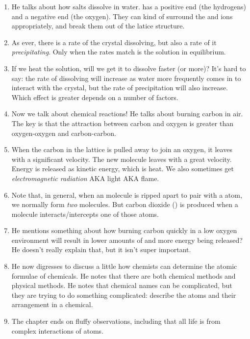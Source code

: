 \begin{enumerate}
  \item He talks about how salts dissolve in water.  has a
  positive end (the hydrogens) and a negative end (the oxygen). They can
  kind of surround the  and  ions appropriately, and
  break them out of the latice structure.

  \item As ever, there is a rate of the crystal dissolving, but also a
  rate of it \emph{precipitating}. Only when the rates match is the
  solution in equilibrium.

  \item If we heat the solution, will we get it to dissolve faster (or
  more)? It's hard to say: the rate of dissolving will increase as water
  more frequently comes in to interact with the crystal, but the rate of
  precipitation will also increase. Which effect is greater depends on a
  number of factors.

  \item Now we talk about chemical reactions! He talks about burning
  carbon in air. The key is that the attraction between carbon and
  oxygen is greater than oxygen-oxygen and carbon-carbon.

  \item When the carbon in the lattice is pulled away to join an oxygen,
  it leaves with a significant velocity. The new  molecule leaves
  with a great velocity. Energy is released as kinetic energy, which is
  heat. We also sometimes get \emph{electromagnetic radiation} AKA
  light AKA flame.

  \item Note that, in general, when an  molecule is ripped apart
  to pair with a  atom, we normally form \emph{two} 
  molecules. But carbon dioxide () is produced when a 
  molecule interacts/intercepts one of those  atoms.

  \item He mentions something about how burning carbon quickly in a low
  oxygen environment will result in lower amounts of  and more
  energy being released? He doesn't really explain that, but it isn't
  super important.

  \item He now digresses to discuss a little how chemists can determine
  the atomic formulae of chemicals. He notes that there are both
  chemical methods and physical methods. He notes that chemical names
  can be complicated, but they are trying to do something complicated:
  describe the atoms and their arrangement in a chemical.

  \item The chapter ends on fluffy observations, including that all life
  is from complex interactions of atoms.

\end{enumerate}
